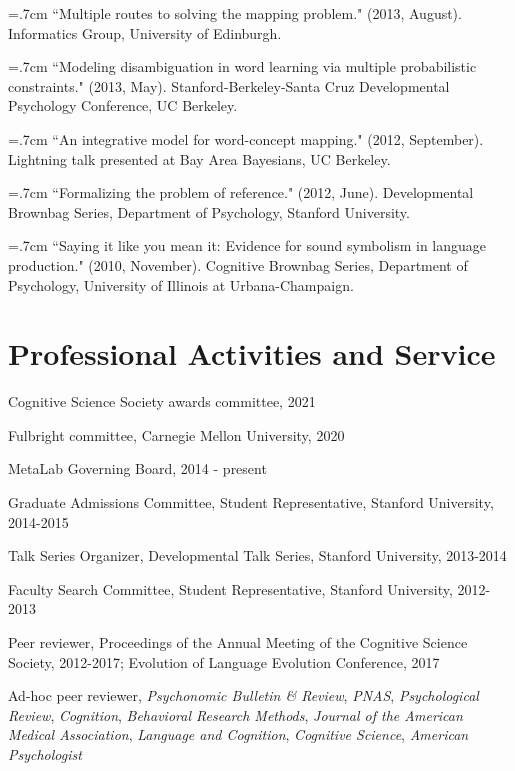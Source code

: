 \documentclass[letterpaper]{article}
\renewenvironment{itemize}{
  \begin{list}{}{
    \setlength{\leftmargin}{1.5em}
  }
}{
  \end{list}
}
\begin{document}
\hangindent=.7cm ``Multiple routes to solving the mapping problem." (2013, August). Informatics Group, University of Edinburgh.

\hangindent=.7cm ``Modeling disambiguation in word learning via multiple probabilistic constraints." (2013, May). Stanford-Berkeley-Santa Cruz Developmental Psychology Conference, UC Berkeley.

 \hangindent=.7cm ``An integrative model for word-concept mapping." (2012, September). Lightning talk presented at Bay Area Bayesians, UC Berkeley.

\hangindent=.7cm ``Formalizing the problem of reference."  (2012, June). Developmental Brownbag Series, Department of Psychology, Stanford University.

\hangindent=.7cm ``Saying it like you mean it: Evidence for sound symbolism in language production." (2010, November). Cognitive Brownbag Series, Department of Psychology, University of Illinois at Urbana-Champaign.

 \singlespacing


\section*{Professional Activities and Service}
\begin{itemize}
\item Cognitive Science Society awards committee, 2021
\item Fulbright committee, Carnegie Mellon University, 2020
\item MetaLab Governing Board, 2014 - present
\item Graduate Admissions Committee, Student Representative, Stanford University, 2014-2015
\item  Talk Series Organizer, Developmental Talk Series, Stanford University, 2013-2014
\item Faculty Search Committee,  Student Representative,  Stanford University, 2012-2013
\item Peer reviewer, Proceedings of the Annual Meeting of the Cognitive Science Society, 2012-2017; Evolution of Language Evolution Conference, 2017
\item Ad-hoc peer reviewer, {\it Psychonomic Bulletin \& Review},  {\it PNAS},  {\it Psychological Review},  {\it Cognition},  {\it Behavioral Research Methods},  {\it Journal of the American Medical Association},  {\it Language and Cognition},   {\it Cognitive Science},   {\it American Psychologist}
\end{itemize}
\end{document}

